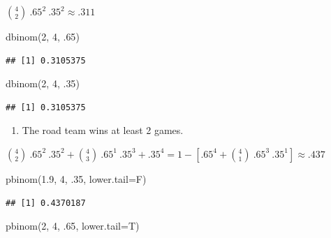 \documentclass[
]{book}
\newenvironment{Shaded}{\begin{snugshade}}{\end{snugshade}}
\newcommand{\AttributeTok}[1]{\textcolor[rgb]{0.77,0.63,0.00}{#1}}
\newcommand{\DecValTok}[1]{\textcolor[rgb]{0.00,0.00,0.81}{#1}}
\newcommand{\FloatTok}[1]{\textcolor[rgb]{0.00,0.00,0.81}{#1}}
\newcommand{\FunctionTok}[1]{\textcolor[rgb]{0.00,0.00,0.00}{#1}}
\newcommand{\NormalTok}[1]{#1}
\providecommand{\tightlist}{%
  \setlength{\itemsep}{0pt}\setlength{\parskip}{0pt}}
\theoremstyle{definition}
\theoremstyle{definition}
\theoremstyle{definition}
\theoremstyle{definition}
\theoremstyle{remark}
\begin{document}
\(\binom{4}{2}\ .65^2\ .35^2 \approx .311\)

\begin{Shaded}
\begin{Highlighting}[]
\FunctionTok{dbinom}\NormalTok{(}\DecValTok{2}\NormalTok{, }\DecValTok{4}\NormalTok{, .}\DecValTok{65}\NormalTok{)}
\end{Highlighting}
\end{Shaded}

\begin{verbatim}
## [1] 0.3105375
\end{verbatim}

\begin{Shaded}
\begin{Highlighting}[]
\FunctionTok{dbinom}\NormalTok{(}\DecValTok{2}\NormalTok{, }\DecValTok{4}\NormalTok{, .}\DecValTok{35}\NormalTok{)}
\end{Highlighting}
\end{Shaded}

\begin{verbatim}
## [1] 0.3105375
\end{verbatim}

\begin{enumerate}
\def\labelenumi{(\alph{enumi})}
\setcounter{enumi}{2}
\tightlist
\item
  The road team wins at least 2 games.
\end{enumerate}

\(\binom{4}{2}\ .65^2\ .35^2 + \binom{4}{3}\ .65^1\ .35^3 + .35^4 = 1 - [.65^4 + \binom{4}{1}\ .65^3\ .35^1] \approx .437\)

\begin{Shaded}
\begin{Highlighting}[]
\FunctionTok{pbinom}\NormalTok{(}\FloatTok{1.9}\NormalTok{, }\DecValTok{4}\NormalTok{, .}\DecValTok{35}\NormalTok{, }\AttributeTok{lower.tail=}\NormalTok{F)}
\end{Highlighting}
\end{Shaded}

\begin{verbatim}
## [1] 0.4370187
\end{verbatim}

\begin{Shaded}
\begin{Highlighting}[]
\FunctionTok{pbinom}\NormalTok{(}\DecValTok{2}\NormalTok{, }\DecValTok{4}\NormalTok{, .}\DecValTok{65}\NormalTok{, }\AttributeTok{lower.tail=}\NormalTok{T)}
\end{Highlighting}
\end{Shaded}
\end{document}
